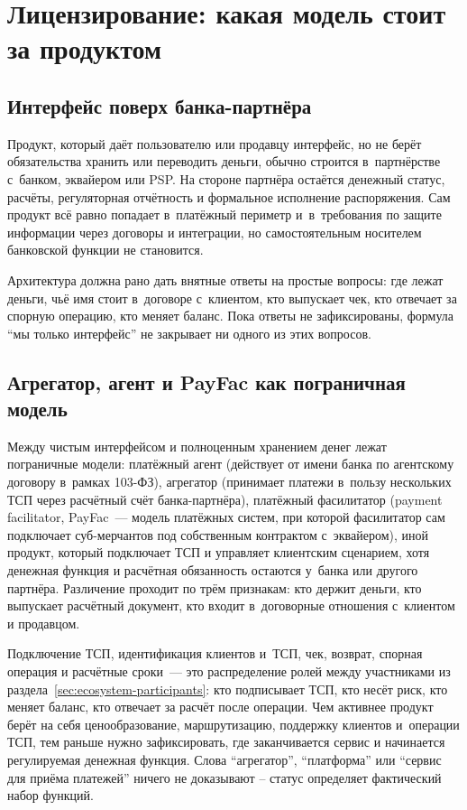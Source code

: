 \section{Лицензирование: какая модель стоит за продуктом}\label{sec:regulation-licensing}

\subsection*{Интерфейс поверх банка-партнёра}

Продукт, который даёт пользователю или продавцу интерфейс, но не берёт обязательства хранить или переводить деньги, обычно строится в~партнёрстве с~банком, эквайером или PSP. На стороне партнёра остаётся денежный статус, расчёты, регуляторная отчётность и формальное исполнение распоряжения.
Сам продукт всё равно попадает в~платёжный периметр и~в~требования по защите информации через договоры и интеграции, но самостоятельным носителем банковской функции не становится.

Архитектура должна рано дать внятные ответы на простые вопросы: где лежат деньги, чьё имя стоит в~договоре с~клиентом, кто выпускает чек, кто отвечает за спорную операцию, кто меняет баланс. Пока ответы не зафиксированы, формула \enquote{мы только интерфейс} не закрывает ни одного из этих вопросов.

\subsection*{Агрегатор, агент и PayFac как пограничная модель}

Между чистым интерфейсом и полноценным хранением денег лежат пограничные модели: платёжный агент (действует от имени банка по агентскому договору в~рамках 103-ФЗ), агрегатор (принимает платежи в~пользу нескольких ТСП через расчётный счёт банка-партнёра), платёжный фасилитатор (payment facilitator, PayFac~--- модель платёжных систем, при которой фасилитатор сам подключает суб-мерчантов под собственным контрактом с~эквайером), иной продукт, который подключает ТСП и управляет клиентским сценарием, хотя денежная функция и расчётная обязанность остаются у~банка или другого партнёра.
Различение проходит по трём признакам: кто держит деньги, кто выпускает расчётный документ, кто входит в~договорные отношения с~клиентом и продавцом.

Подключение ТСП, идентификация клиентов и~ТСП, чек, возврат, спорная операция и расчётные сроки~--- это распределение ролей между участниками из раздела~\ref{sec:ecosystem-participants}: кто подписывает ТСП, кто несёт риск, кто меняет баланс, кто отвечает за расчёт после операции.
Чем активнее продукт берёт на себя ценообразование, маршрутизацию, поддержку клиентов и~операции ТСП, тем раньше нужно зафиксировать, где заканчивается сервис и начинается регулируемая денежная функция. Слова \enquote{агрегатор}, \enquote{платформа} или \enquote{сервис для приёма платежей} ничего не доказывают -- статус определяет фактический набор функций.

